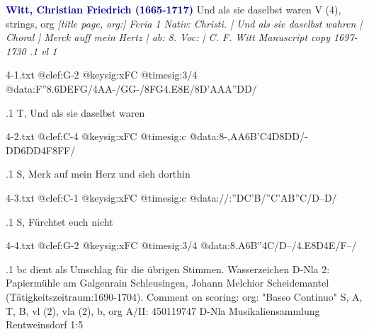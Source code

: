 \documentclass[twocolumn]{book}
\begin{document}
\newline \textcolor{darkblue}{\textbf{Witt, Christian Friedrich (1665-1717)
}}
\newline Und als sie daselbst waren
\newline V (4), strings, org
\newline \itshape [title page, org:] Feria 1 Nativ: Christi. | Und als sie daselbst wahren | Choral | Merck auff mein Hertz | ab: 8. Voc: | C. F. Witt \normalfont 
\newline \textcolor{darkblue}{} Manuscript copy 1697-1730
.1 vl 1
\newline
\begin{filecontents*}{4-1.txt}
@clef:G-2
@keysig:xFC
@timesig:3/4
@data:F''8.6{DE}{FG}/4AA-/GG-/{8FG}4.E8E/{8D'AAA''DD}/
\end{filecontents*}
\immediate{}
%
.1 T, Und als sie daselbst waren
\newline
\begin{filecontents*}{4-2.txt}
@clef:C-4
@keysig:xFC
@timesig:c
@data:8-,AA6B'C4D8DD/-DD6DD4F8FF/
\end{filecontents*}
\immediate{}
%
.1 S, Merk auf mein Herz und sieh dorthin
\newline
\begin{filecontents*}{4-3.txt}
@clef:C-1
@keysig:xFC
@timesig:c
@data://:''DC'B/''C'AB''C/D--D/
\end{filecontents*}
\immediate{}
%
.1 S, Fürchtet euch nicht
\newline
\begin{filecontents*}{4-4.txt}
@clef:G-2
@keysig:xFC
@timesig:3/4
@data:8.A6B''4C/D--/4.E8D4E/F--/
\end{filecontents*}
\immediate{}
%
.1
\newline bc dient als Umschlag für die übrigen Stimmen.
\newline Wasserzeichen D-Nla 2: Papiermühle am Galgenrain Schleusingen, Johann Melchior Scheidemantel (Tätigkeitszeitraum:1690-1704).
\newline Comment on scoring: org: "Basso Continuo"
\newline S, A, T, B, vl (2), vla (2), b, org
\newline A/II: 450119747
\newline D-Nla Musikaliensammlung Rentweinsdorf 1:5
\newline 
\end{document}
